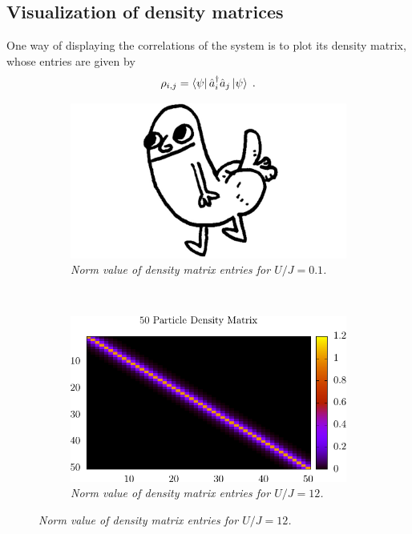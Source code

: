 \subsection{Visualization of density matrices}
One way of displaying the correlations of the system is to plot its density matrix, whose entries are given by
\begin{equation}
	\rho_{i,j} = \bra{\psi} \hat{a}_{i}^{\dag} \hat{a}_j \ket{\psi} \; .
\end{equation}
\begin{figure}[h!]
    \centering
    \begin{subfigure}[t]{0.49\textwidth}
        \includegraphics[width=\textwidth]{Figures/placeholder.jpg}
        \caption{\textit{Norm value of density matrix entries for $U/J = 0.1$.}}
        \label{fig:DensityMatSF}
    \end{subfigure}
    ~
    \begin{subfigure}[t]{0.49\textwidth}
        \includegraphics[width=\textwidth]{Figures/DensityMatMI.pdf}
        \caption{\textit{Norm value of density matrix entries for $U/J = 12$.}}
        \label{fig:DensityMatMI}
    \end{subfigure}    
\end{figure}

